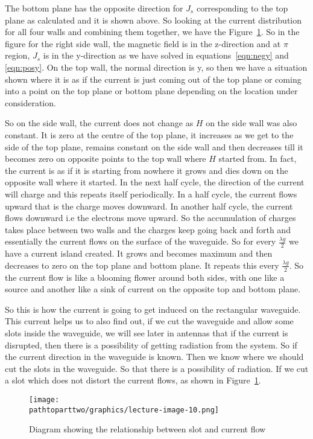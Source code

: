 The bottom plane has the opposite direction for $J_{s}$ corresponding to the top plane as calculated and it is shown above. So looking at the current distribution for all four walls and combining them together, we have the Figure~\ref{fig:lectureimage10}. So in the figure for the right side wall, the magnetic field is in the z-direction and at $\pi$ region, $J_{s}$ is in the y-direction as we have solved in equations~\ref{eqn:negy} and \ref{eqn:posy}. On the top wall, the normal direction is y, so then we have a situation shown where it is as if the current is just coming out of the top plane or coming into a point on the top plane or bottom plane depending on the location under consideration. 

So on the side wall, the current does not change as $H$ on the side wall was also constant. It is zero at the centre of the top plane, it increases as we get to the side of the top plane, remains constant on the side wall and then decreases till it becomes zero on opposite points to the top wall where $H$ started from. In fact, the current is as if it is starting from nowhere it grows and dies down on the opposite wall where it started. In the next half cycle, the direction of the current will charge and this repeats itself periodically. In a half cycle, the current flows upward that is the charge moves downward. In another half cycle, the current flows downward i.e the electrons move upward. So the accumulation of charges takes place between two walls and the charges keep going back and forth and essentially the current flows on the surface of the waveguide. So for every $\frac{\lambda g}{2}$ we have a current island created. It grows and becomes maximum and then decreases to zero on the top plane and bottom plane. It repeats this every $\frac{\lambda g}{2}$. So the current flow is like a blooming flower around both sides, with one like a source and another like a sink of current on the opposite top and bottom plane.
	
So this is how the current is going to get induced on the rectangular waveguide. This current helps us to also find out, if we cut the waveguide and allow some slots inside the waveguide, we will see later in antennas that if the current is disrupted, then there is a possibility of getting radiation from the system. So if the current direction in the waveguide is known. Then we know where we should cut the slots in the waveguide. So that there is a possibility of radiation. If we cut a slot which does not distort the current flows, as shown in Figure~\ref{fig:lectureimage10}.
\begin{figure}[h]
\centering
\texttt{[image: \\pathtoparttwo/graphics/lecture-image-10.png]}
\label{fig:lectureimage10}
\caption{Diagram showing the relationship between slot and current flow}
\end{figure}

